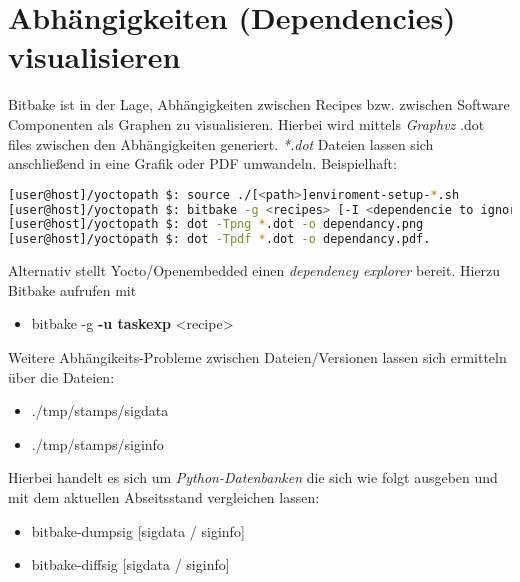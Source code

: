 

\section{Abhängigkeiten (Dependencies) visualisieren }%
\label{sec:abhangigkeiten_dependencies_visualisieren_}
Bitbake ist in der Lage, Abhängigkeiten zwischen Recipes bzw. zwischen Software
Componenten als Graphen zu visualisieren. Hierbei wird mittels \textit{Graphvz}
{.dot} files zwischen den Abhängigkeiten generiert. \textit{*.dot} Dateien
lassen sich anschließend in eine Grafik oder PDF umwandeln. Beispielhaft:


\begin{lstlisting}[frame=single,language=bash,caption={Dependency Graph}]
[user@host]/yoctopath $: source ./[<path>]enviroment-setup-*.sh
[user@host]/yoctopath $: bitbake -g <recipes> [-I <dependencie to ignore> ]
[user@host]/yoctopath $: dot -Tpng *.dot -o dependancy.png
[user@host]/yoctopath $: dot -Tpdf *.dot -o dependancy.pdf.
\end{lstlisting}

Alternativ stellt Yocto/Openembedded einen \textit{dependency explorer} bereit.
Hierzu Bitbake aufrufen mit
\begin{itemize}
    \item bitbake -g \textbf{-u taskexp} <recipe>
\end{itemize}

Weitere Abhängikeits-Probleme zwischen Dateien/Versionen lassen sich ermitteln
über die Dateien:
\begin{itemize}
    \item ./tmp/stamps/sigdata
    \item ./tmp/stamps/siginfo
\end{itemize}

Hierbei handelt es sich um \textit{Python-Datenbanken} die sich wie folgt
ausgeben und mit dem aktuellen Abseitsstand vergleichen lassen:

\begin{itemize}
    \item bitbake-dumpsig [sigdata / siginfo]
    \item bitbake-diffsig [sigdata / siginfo]
\end{itemize}




